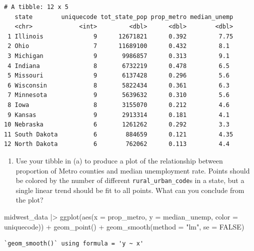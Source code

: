 \documentclass[
  letterpaper,
  DIV=11,
  numbers=noendperiod]{scrartcl}
\newenvironment{Shaded}{\begin{snugshade}}{\end{snugshade}}
\newcommand{\AttributeTok}[1]{\textcolor[rgb]{0.40,0.45,0.13}{#1}}
\newcommand{\ConstantTok}[1]{\textcolor[rgb]{0.56,0.35,0.01}{#1}}
\newcommand{\FunctionTok}[1]{\textcolor[rgb]{0.28,0.35,0.67}{#1}}
\newcommand{\NormalTok}[1]{\textcolor[rgb]{0.00,0.23,0.31}{#1}}
\newcommand{\SpecialCharTok}[1]{\textcolor[rgb]{0.37,0.37,0.37}{#1}}
\newcommand{\StringTok}[1]{\textcolor[rgb]{0.13,0.47,0.30}{#1}}
\providecommand{\tightlist}{%
  \setlength{\itemsep}{0pt}\setlength{\parskip}{0pt}}
\begin{document}
\begin{verbatim}
# A tibble: 12 x 5
   state        uniquecode tot_state_pop prop_metro median_unemp
   <chr>             <int>         <dbl>      <dbl>        <dbl>
 1 Illinois              9      12671821      0.392         7.75
 2 Ohio                  7      11689100      0.432         8.1 
 3 Michigan              9       9986857      0.313         9.1 
 4 Indiana               8       6732219      0.478         6.5 
 5 Missouri              9       6137428      0.296         5.6 
 6 Wisconsin             8       5822434      0.361         6.3 
 7 Minnesota             9       5639632      0.310         5.6 
 8 Iowa                  8       3155070      0.212         4.6 
 9 Kansas                9       2913314      0.181         4.1 
10 Nebraska              6       1261262      0.292         3.3 
11 South Dakota          6        884659      0.121         4.35
12 North Dakota          6        762062      0.113         4.4 
\end{verbatim}

\begin{enumerate}
\def\labelenumi{\alph{enumi})}
\setcounter{enumi}{1}
\tightlist
\item
  Use your tibble in (a) to produce a plot of the relationship between
  proportion of Metro counties and median unemployment rate. Points
  should be colored by the number of different
  \texttt{rural\_urban\_code}s in a state, but a single linear trend
  should be fit to all points. What can you conclude from the plot?
\end{enumerate}

\begin{Shaded}
\begin{Highlighting}[]
\NormalTok{midwest\_data }\SpecialCharTok{|\textgreater{}} 
  \FunctionTok{ggplot}\NormalTok{(}\FunctionTok{aes}\NormalTok{(}\AttributeTok{x =}\NormalTok{ prop\_metro,}
             \AttributeTok{y =}\NormalTok{ median\_unemp,}
             \AttributeTok{color =}\NormalTok{ uniquecode)) }\SpecialCharTok{+}
  \FunctionTok{geom\_point}\NormalTok{() }\SpecialCharTok{+} \FunctionTok{geom\_smooth}\NormalTok{(}\AttributeTok{method =} \StringTok{"lm"}\NormalTok{, }\AttributeTok{se =} \ConstantTok{FALSE}\NormalTok{)}
\end{Highlighting}
\end{Shaded}

\begin{verbatim}
`geom_smooth()` using formula = 'y ~ x'
\end{verbatim}
\end{document}
